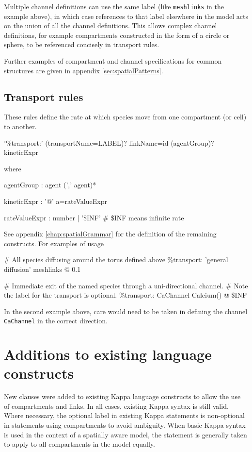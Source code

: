 Multiple channel definitions can use the same label (like \verb|meshlinks| in the example above), in which case references to that label elsewhere in the model acts on the union of all the channel definitions. This allows complex channel definitions, for example compartments constructed in the form of a circle or sphere, to be referenced concisely in transport rules.

Further examples of compartment and channel specifications for common structures are given in appendix
 \ref{sec:spatialPatterns}.

\subsection{Transport rules}

These rules define the rate at which species move from one compartment (or cell) to another.
\begin{bnfsource}
'\%transport:' (transportName=LABEL)? linkName=id (agentGroup)? kineticExpr
\end{bnfsource}
  where
\begin{bnfsource}
agentGroup :
  agent (',' agent)*

kineticExpr :
  '@' a=rateValueExpr

rateValueExpr :
  number | '\$INF'   # \$INF means infinite rate
\end{bnfsource}

See appendix \ref{chap:spatialGrammar} for the definition of the remaining constructs. For examples of usage

\begin{kappasource}
# All species diffusing around the torus defined above
\%transport: 'general diffusion' meshlinks @ 0.1

# Immediate exit of the named species through a uni-directional channel.
# Note the label for the transport is optional.
\%transport: CaChannel Calcium() @ \$INF
\end{kappasource}

In the second example above, care would need to be taken in defining the channel \verb|CaChannel| in the correct direction.

\section{Additions to existing language constructs}

New clauses were added to existing Kappa language constructs to allow the use of compartments and links. In all cases, existing Kappa syntax is still valid. Where necessary, the optional label in existing Kappa statements is non-optional in statements using compartments to avoid ambiguity. When basic Kappa syntax is used in the context of a spatially aware model, the statement is generally taken to apply to all compartments in the model equally.

